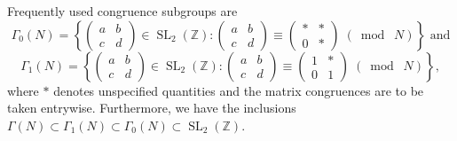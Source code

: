 \documentclass[10pt,leqno]{article}
\newcommand{\cbr}[1]{\left\{#1\right\}}
\DeclareMathOperator{\SL}{SL}
\newcommand{\smod}[1]{\;(\bmod\; #1)}
\begin{document}
Frequently used congruence subgroups are 
\[\varGamma_0(N) = \cbr{\begin{pmatrix}
    a & b \\ c & d
\end{pmatrix}\in\SL_2(\mathbb{Z}): \begin{pmatrix}
    a & b \\ c & d
\end{pmatrix}\equiv\begin{pmatrix}
    \ast & \ast \\ 0 & \ast
\end{pmatrix}\smod N}\text{ and}\]
\[\varGamma_1(N) = \cbr{\begin{pmatrix}
    a & b \\ c & d
\end{pmatrix}\in \SL_2(\mathbb{Z}): \begin{pmatrix}
    a & b \\ c & d 
\end{pmatrix}\equiv \begin{pmatrix}
    1 & \ast \\ 0 & 1
\end{pmatrix}\smod N},\] where $\ast$ denotes unspecified quantities and the matrix congruences are to be taken entrywise. Furthermore, we have the inclusions $\varGamma(N)\subset\varGamma_1(N)\subset\varGamma_0(N)\subset\SL_2(\mathbb{Z})$.
\end{document}

